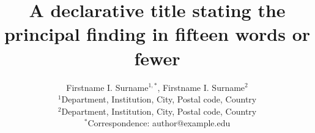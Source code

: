 \documentclass[11pt,a4paper]{article}
\title{A declarative title stating the principal finding in fifteen words or fewer}
\author{Firstname I. Surname$^{1,*}$, Firstname I. Surname$^{2}$\\[0.5em]
\small $^{1}$Department, Institution, City, Postal code, Country\\
\small $^{2}$Department, Institution, City, Postal code, Country\\
\small $^{*}$Correspondence: author@example.edu}
\date{}
\begin{document}
\linenumbers
\maketitle










\end{document}

